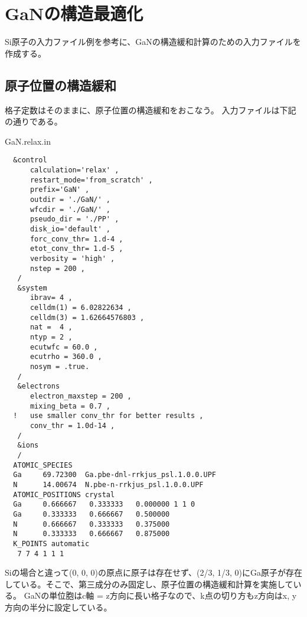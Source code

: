 \section{GaNの構造最適化}
Si原子の入力ファイル例を参考に、GaNの構造緩和計算のための入力ファイルを作成する。
\subsection{原子位置の構造緩和}
格子定数はそのままに、原子位置の構造緩和をおこなう。
入力ファイルは下記の通りである。
\begin{example}{GaN.relax.in}
\begin{verbatim}
  &control
      calculation='relax' ,
      restart_mode='from_scratch' ,
      prefix='GaN' ,
      outdir = './GaN/' ,
      wfcdir = './GaN/' ,
      pseudo_dir = './PP' ,
      disk_io='default' ,
      forc_conv_thr= 1.d-4 ,
      etot_conv_thr= 1.d-5 ,
      verbosity = 'high' ,
      nstep = 200 ,
   /
   &system
      ibrav= 4 ,
      celldm(1) = 6.02822634 ,
      celldm(3) = 1.62664576803 ,
      nat =  4 ,
      ntyp = 2 ,
      ecutwfc = 60.0 ,
      ecutrho = 360.0 ,
      nosym = .true.
   /
   &electrons
      electron_maxstep = 200 ,
      mixing_beta = 0.7 ,
  !   use smaller conv_thr for better results ,
      conv_thr = 1.0d-14 ,
   /
   &ions
   /
  ATOMIC_SPECIES
  Ga     69.72300  Ga.pbe-dnl-rrkjus_psl.1.0.0.UPF
  N      14.00674  N.pbe-n-rrkjus_psl.1.0.0.UPF
  ATOMIC_POSITIONS crystal
  Ga     0.666667   0.333333   0.000000 1 1 0
  Ga     0.333333   0.666667   0.500000
  N      0.666667   0.333333   0.375000
  N      0.333333   0.666667   0.875000
  K_POINTS automatic
   7 7 4 1 1 1
\end{verbatim}
\end{example}
Siの場合と違って(0, 0, 0)の原点に原子は存在せず、(2/3, 1/3, 0)にGa原子が存在している。そこで、第三成分のみ固定し、原子位置の構造緩和計算を実施している。
GaNの単位胞はc軸 = z方向に長い格子なので、k点の切り方もz方向はx, y方向の半分に設定している。

